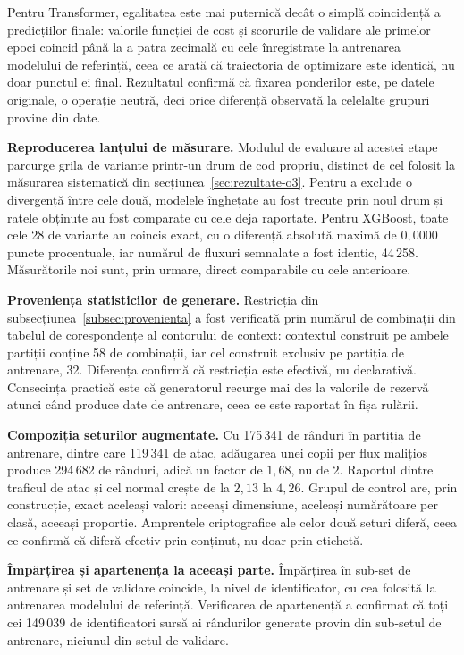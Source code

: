 Pentru Transformer, egalitatea este mai puternică decât o simplă coincidență a predicțiilor finale: valorile funcției de cost și scorurile de validare ale primelor epoci coincid până la a patra zecimală cu cele înregistrate la antrenarea modelului de referință, ceea ce arată că traiectoria de optimizare este identică, nu doar punctul ei final. Rezultatul confirmă că fixarea ponderilor este, pe datele originale, o operație neutră, deci orice diferență observată la celelalte grupuri provine din date.

\textbf{Reproducerea lanțului de măsurare.} Modulul de evaluare al acestei etape parcurge grila de variante printr-un drum de cod propriu, distinct de cel folosit la măsurarea sistematică din secțiunea~\ref{sec:rezultate-o3}. Pentru a exclude o divergență între cele două, modelele înghețate au fost trecute prin noul drum și ratele obținute au fost comparate cu cele deja raportate. Pentru XGBoost, toate cele 28 de variante au coincis exact, cu o diferență absolută maximă de $0{,}0000$ puncte procentuale, iar numărul de fluxuri semnalate a fost identic, 44\,258. Măsurătorile noi sunt, prin urmare, direct comparabile cu cele anterioare.

\textbf{Proveniența statisticilor de generare.} Restricția din subsecțiunea~\ref{subsec:provenienta} a fost verificată prin numărul de combinații din tabelul de corespondențe al contorului de context: contextul construit pe ambele partiții conține 58 de combinații, iar cel construit exclusiv pe partiția de antrenare, 32. Diferența confirmă că restricția este efectivă, nu declarativă. Consecința practică este că generatorul recurge mai des la valorile de rezervă atunci când produce date de antrenare, ceea ce este raportat în fișa rulării.

\textbf{Compoziția seturilor augmentate.} Cu 175\,341 de rânduri în partiția de antrenare, dintre care 119\,341 de atac, adăugarea unei copii per flux malițios produce 294\,682 de rânduri, adică un factor de $1{,}68$, nu de $2$. Raportul dintre traficul de atac și cel normal crește de la $2{,}13$ la $4{,}26$. Grupul de control are, prin construcție, exact aceleași valori: aceeași dimensiune, aceleași numărătoare per clasă, aceeași proporție. Amprentele criptografice ale celor două seturi diferă, ceea ce confirmă că diferă efectiv prin conținut, nu doar prin etichetă.

\textbf{Împărțirea și apartenența la aceeași parte.} Împărțirea în sub-set de antrenare și set de validare coincide, la nivel de identificator, cu cea folosită la antrenarea modelului de referință. Verificarea de apartenență a confirmat că toți cei 149\,039 de identificatori sursă ai rândurilor generate provin din sub-setul de antrenare, niciunul din setul de validare.



